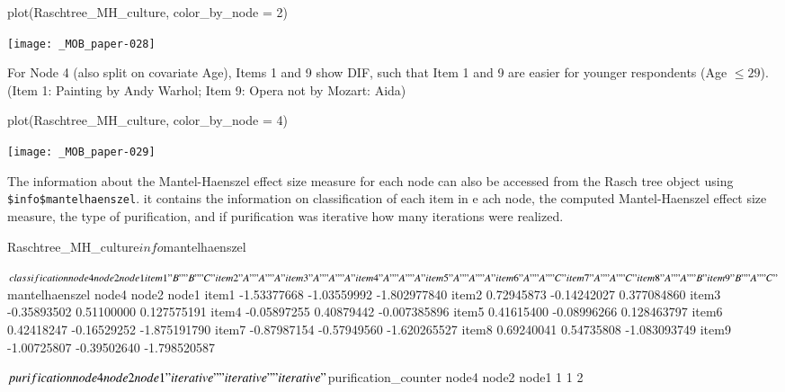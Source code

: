 \documentclass[doc,floatsintext,natbib]{apa7}
\begin{document}
\begin{Schunk}
\begin{Sinput}
 plot(Raschtree_MH_culture, color_by_node = 2)
\end{Sinput}
\end{Schunk}
\texttt{[image: \_MOB\_paper-028]}

For Node 4 (also split on covariate Age), Items 1 and 9 show DIF, such that Item 1 and 9 are easier for younger respondents (Age $\leq 29$). (Item 1: Painting by Andy Warhol; Item 9: Opera not by Mozart: Aida)

\begin{Schunk}
\begin{Sinput}
 plot(Raschtree_MH_culture, color_by_node = 4)
\end{Sinput}
\end{Schunk}
\texttt{[image: \_MOB\_paper-029]}




The information about the Mantel-Haenszel effect size measure for each node can also be accessed from the Rasch tree object using \texttt{\$info\$mantelhaenszel}. it contains the information on classification of each item in e ach node, the computed Mantel-Haenszel effect size measure, the type of purification, and if purification was iterative how many iterations were realized. 

\begin{Schunk}
\begin{Sinput}
 Raschtree_MH_culture$info$mantelhaenszel
\end{Sinput}
\begin{Soutput}
$classification
      node4 node2 node1
item1 "B"   "B"   "C"  
item2 "A"   "A"   "A"  
item3 "A"   "A"   "A"  
item4 "A"   "A"   "A"  
item5 "A"   "A"   "A"  
item6 "A"   "A"   "C"  
item7 "A"   "A"   "C"  
item8 "A"   "A"   "B"  
item9 "B"   "A"   "C"  

$mantelhaenszel
            node4       node2        node1
item1 -1.53377668 -1.03559992 -1.802977840
item2  0.72945873 -0.14242027  0.377084860
item3 -0.35893502  0.51100000  0.127575191
item4 -0.05897255  0.40879442 -0.007385896
item5  0.41615400 -0.08996266  0.128463797
item6  0.42418247 -0.16529252 -1.875191790
item7 -0.87987154 -0.57949560 -1.620265527
item8  0.69240041  0.54735808 -1.083093749
item9 -1.00725807 -0.39502640 -1.798520587

$purification
      node4       node2       node1 
"iterative" "iterative" "iterative" 

$purification_counter
node4 node2 node1 
    1     1     2 
\end{Soutput}
\end{Schunk}
\end{document}
